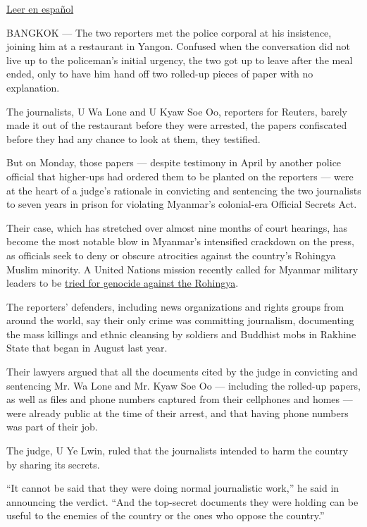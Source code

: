 \href{https://www.nytimes3xbfgragh.onion/es/2018/09/03/birmania-reuters-rohinya}{Leer
en español}

BANGKOK --- The two reporters met the police corporal at his insistence,
joining him at a restaurant in Yangon. Confused when the conversation
did not live up to the policeman's initial urgency, the two got up to
leave after the meal ended, only to have him hand off two rolled-up
pieces of paper with no explanation.

The journalists, U Wa Lone and U Kyaw Soe Oo, reporters for Reuters,
barely made it out of the restaurant before they were arrested, the
papers confiscated before they had any chance to look at them, they
testified.

But on Monday, those papers --- despite testimony in April by another
police official that higher-ups had ordered them to be planted on the
reporters --- were at the heart of a judge's rationale in convicting and
sentencing the two journalists to seven years in prison for violating
Myanmar's colonial-era Official Secrets Act.

Their case, which has stretched over almost nine months of court
hearings, has become the most notable blow in Myanmar's intensified
crackdown on the press, as officials seek to deny or obscure atrocities
against the country's Rohingya Muslim minority. A United Nations mission
recently called for Myanmar military leaders to be
\href{https://www.nytimes3xbfgragh.onion/2018/08/27/world/asia/myanmar-rohingya-genocide.html}{tried
for genocide against the Rohingya}.

The reporters' defenders, including news organizations and rights groups
from around the world, say their only crime was committing journalism,
documenting the mass killings and ethnic cleansing by soldiers and
Buddhist mobs in Rakhine State that began in August last year.

Their lawyers argued that all the documents cited by the judge in
convicting and sentencing Mr. Wa Lone and Mr. Kyaw Soe Oo --- including
the rolled-up papers, as well as files and phone numbers captured from
their cellphones and homes --- were already public at the time of their
arrest, and that having phone numbers was part of their job.

The judge, U Ye Lwin, ruled that the journalists intended to harm the
country by sharing its secrets.

``It cannot be said that they were doing normal journalistic work,'' he
said in announcing the verdict. ``And the top-secret documents they were
holding can be useful to the enemies of the country or the ones who
oppose the country.''

